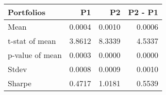 \begin{tabular}{lrrr}
\toprule
Portfolios & P1 & P2 & P2 - P1 \\
\midrule
Mean & 0.0004 & 0.0010 & 0.0006 \\
t-stat of mean & 3.8612 & 8.3339 & 4.5337 \\
p-value of mean & 0.0003 & 0.0000 & 0.0000 \\
Stdev & 0.0008 & 0.0009 & 0.0010 \\
Sharpe & 0.4717 & 1.0181 & 0.5539 \\
\bottomrule
\end{tabular}
